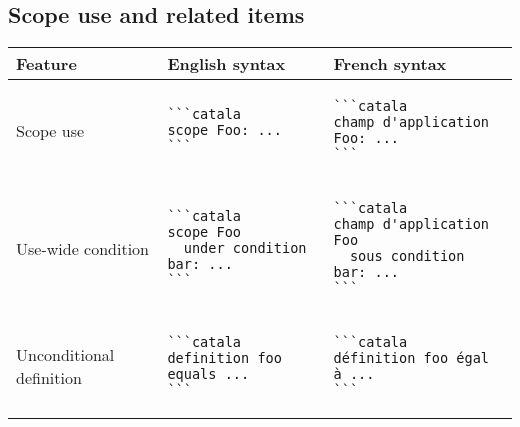 \documentclass[a3paper,landscape]{article}
\begin{document}
\begin{multicols*}{2}
  \section*{Scope use and related items}
  \begin{center}
    \begin{tabular}{p{}p{}p{}}
      \toprule
      Feature                                 & English syntax & French syntax \\\midrule
      Scope use                               &
      \vspace*{-1.75em}
      \begin{verbatim}
```catala
scope Foo: ...
```
\end{verbatim}
      \vspace*{-1.75em}
                                              &
      \vspace*{-1.75em}
      \begin{verbatim}
```catala
champ d'application Foo: ...
```
\end{verbatim}
      \vspace*{-1.75em}
      \\
      Use-wide condition                      &
      \vspace*{-1.75em}
      \begin{verbatim}
```catala
scope Foo
  under condition bar: ...
```
\end{verbatim}
      \vspace*{-1.75em}
                                              &
      \vspace*{-1.75em}
      \begin{verbatim}
```catala
champ d'application Foo
  sous condition bar: ...
```
\end{verbatim}
      \vspace*{-1.75em}
      \\
      Unconditional definition                &
      \vspace*{-1.75em}
      \begin{verbatim}
```catala
definition foo equals ...
```
\end{verbatim}
      \vspace*{-1.75em}
                                              &
      \vspace*{-1.75em}
      \begin{verbatim}
```catala
définition foo égal à ...
```
\end{verbatim}

\end{tabular}
\end{center}
\end{multicols*}
\end{document}
